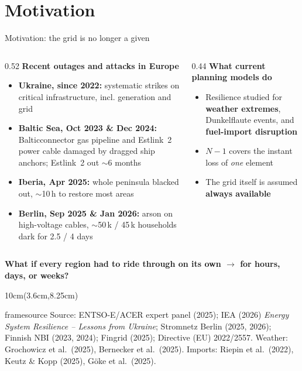 \documentclass[10pt,aspectratio=169,dvipsnames]{beamer}
\newcommand{\source}[1]{\begin{textblock*}{10cm}(3.6cm,8.25cm)
    \begin{beamercolorbox}[ht=0.5cm,right]{framesource}
        \usebeamerfont{framesource}\usebeamercolor[fg]{framesource} Source: {#1}
    \end{beamercolorbox}
\end{textblock*}}
\newcommand{\takeaway}[1]{%
  \par\smallskip
  \colorbox{panel}{\parbox{\dimexpr\linewidth-2\fboxsep}{\footnotesize\strut#1\strut}}}
\begin{document}
\section{Motivation}
 {
  \begin{frame}{Motivation: the grid is no longer a given}
	  \vspace{-0.4em}
	  \begin{columns}[T,onlytextwidth]
		  \begin{column}{0.52\textwidth}
			  {\bfseries\color{adv}Recent outages and attacks in Europe}\par\smallskip
			  \begin{itemize}\setlength{\itemsep}{0.35em}
				  \item \textbf{Ukraine, since 2022:} systematic strikes on critical infrastructure, incl. generation and grid
				  \item \textbf{Baltic Sea, Oct 2023 \& Dec 2024:} Balticconnector gas pipeline and
				        Estlink~2 power cable damaged by dragged ship anchors; Estlink~2 out ${\sim}$6
				        months
				  \item \textbf{Iberia, Apr 2025:} whole peninsula blacked out, ${\sim}$10\,h to restore
				        most areas
				  \item \textbf{Berlin, Sep 2025 \& Jan 2026:} arson on high-voltage cables,
				        ${\sim}$50\,k / 45\,k households dark for 2.5 / 4 days
			  \end{itemize}
		  \end{column}
		  \begin{column}{0.44\textwidth}
			  {\bfseries\color{inv}What current planning models do}\par\smallskip
			  \begin{itemize}\setlength{\itemsep}{0.35em}
				  \item Resilience studied for \textbf{weather extremes}, Dunkelflaute events, and \textbf{fuel-import
					        disruption}
				  \item $N{-}1$ covers the instant loss of \emph{one} element
				  \item The grid itself is assumed \textbf{always available}
			  \end{itemize}
		  \end{column}
	  \end{columns}
	  \vspace{0.3em}
	  \takeaway{\textbf{What if every region had to ride through on its own $\rightarrow$ for hours, days,
			  or weeks?}}
	  \source{ENTSO-E/ACER expert panel (2025); IEA (2026) \emph{Energy System Resilience --
			  Lessons from Ukraine}; Stromnetz Berlin (2025, 2026); Finnish NBI (2023, 2024); Fingrid (2025); Directive (EU)
		  2022/2557. Weather: Grochowicz et al.\ (2025), Bernecker et al.\ (2025). Imports: Riepin et
		  al.\ (2022), Keutz \& Kopp (2025), Göke et al.\ (2025).}
  \end{frame}}
\end{document}
